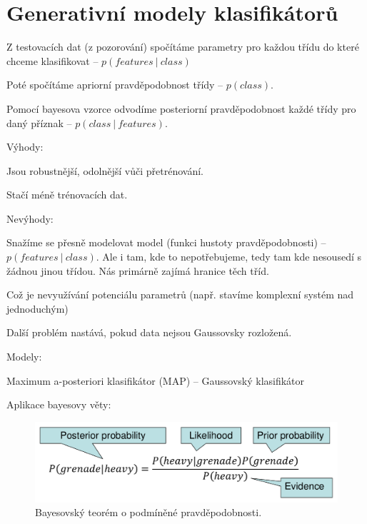 
\section{Generativní modely klasifikátorů}

\begin{compactitem}
    \item Z testovacích dat (z pozorování) spočítáme parametry pro každou třídu do které chceme klasifikovat -- $p(features ~|~ class)$

    \item Poté spočítáme apriorní pravděpodobnost třídy -- $p(class)$.

    \item Pomocí bayesova vzorce odvodíme posteriorní pravděpodobnost každé třídy pro daný příznak -- $p(class ~|~ features)$.

    \item Výhody: \begin{compactitem}
        \item Jsou robustnější, odolnější vůči přetrénování.
        \item Stačí méně trénovacích dat.
    \end{compactitem}

    \item Nevýhody: \begin{compactitem}
        \item Snažíme se přesně modelovat model (funkci hustoty pravděpodobnosti) --\break $p(features ~|~ class)$. Ale i tam, kde to nepotřebujeme, tedy tam kde nesousedí s žádnou jinou třídou. Nás primárně zajímá hranice těch tříd.
        \item Což je nevyužívání potenciálu parametrů (např. stavíme komplexní systém nad jednoduchým)
        \item Další problém nastává, pokud data nejsou Gaussovsky rozložená.
    \end{compactitem}

    \item Modely: \begin{compactitem}
        \item Maximum a-posteriori klasifikátor (MAP) -- Gaussovský klasifikátor
    \end{compactitem}

    \item Aplikace bayesovy věty:
    \begin{figure}[H]
        \centering
        \includegraphics[width=0.75\linewidth]{bayes.pdf}
        \caption{Bayesovský teorém o podmíněné pravděpodobnosti.}
    \end{figure}


\end{compactitem}
